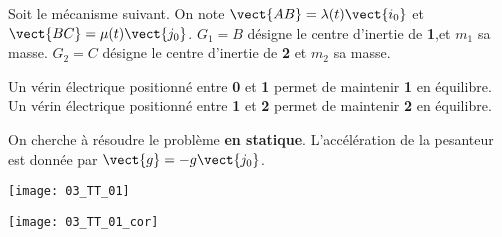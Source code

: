 \normaltrue
\correctiontrue



\setcounter{question}{0}
\ifcorrection
\else
{}
\fi

\ifprof
\else
Soit le mécanisme suivant. On note $\vect{AB}=\lambda(t)\vect{i_0}$ et $\vect{BC}=\mu(t)\vect{j_0}$.
$G_1 = B$ désigne le centre d'inertie de \textbf{1},et $m_1$ sa masse. %
$G_2 = C$ désigne le centre d'inertie de \textbf{2} et  $m_2$ sa masse. %

 Un vérin électrique positionné entre \textbf{0} et \textbf{1} permet de maintenir \textbf{1} en équilibre.
 Un vérin électrique positionné entre \textbf{1} et \textbf{2} permet de maintenir \textbf{2} en équilibre.
 
 On cherche à résoudre le problème \textbf{en statique}.
L'accélération de la pesanteur est donnée par $\vect{g}=-g\vect{j_0}$.



\begin{center}
\texttt{[image: 03\_TT\_01]}
\end{center}
\fi

\ifprof
\begin{center}
\texttt{[image: 03\_TT\_01\_cor]}
\end{center}

\else
\fi




\ifprof
\else
\fi

\ifprof
\else
\fi


